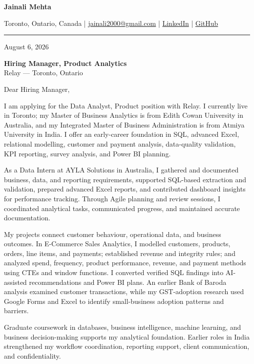 \documentclass[letterpaper,10pt]{article}
\begin{document}
\begin{center}
  {\fontsize{17}{19}\selectfont\textbf{Jainali Mehta}}\par\vspace{2pt}
  \small Toronto, Ontario, Canada \;|\;
  \href{mailto:jainali2000@gmail.com}{jainali2000@gmail.com} \;|\;
  \href{https://www.linkedin.com/in/jainali-mehta}{LinkedIn} \;|\;
  \href{https://github.com/jainalimehta}{GitHub}
\end{center}
\vspace{-5pt}
\noindent\rule{\textwidth}{0.4pt}

August 6, 2026

\textbf{Hiring Manager, Product Analytics}\\
Relay --- Toronto, Ontario

Dear Hiring Manager,

I am applying for the Data Analyst, Product position with Relay. I currently live in Toronto; my Master of Business Analytics is from Edith Cowan University in Australia, and my Integrated Master of Business Administration is from Atmiya University in India. I offer an early-career foundation in SQL, advanced Excel, relational modelling, customer and payment analysis, data-quality validation, KPI reporting, survey analysis, and Power BI planning.

As a Data Intern at AYLA Solutions in Australia, I gathered and documented business, data, and reporting requirements, supported SQL-based extraction and validation, prepared advanced Excel reports, and contributed dashboard insights for performance tracking. Through Agile planning and review sessions, I coordinated analytical tasks, communicated progress, and maintained accurate documentation.

My projects connect customer behaviour, operational data, and business outcomes. In E-Commerce Sales Analytics, I modelled customers, products, orders, line items, and payments; established revenue and integrity rules; and analyzed spend, frequency, product performance, revenue, and payment methods using CTEs and window functions. I converted verified SQL findings into AI-assisted recommendations and Power BI plans. An earlier Bank of Baroda analysis examined customer transactions, while my GST-adoption research used Google Forms and Excel to identify small-business adoption patterns and barriers.

Graduate coursework in databases, business intelligence, machine learning, and business decision-making supports my analytical foundation. Earlier roles in India strengthened my workflow coordination, reporting support, client communication, and confidentiality.
\end{document}
